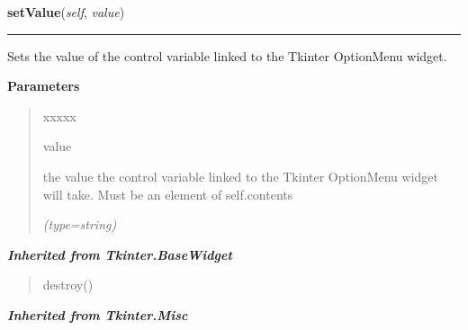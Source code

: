 \hspace{.8\funcindent}\begin{boxedminipage}{\funcwidth}

    \raggedright \textbf{setValue}(\textit{self}, \textit{value})

    \vspace{-1.5ex}

    \rule{\textwidth}{0.5\fboxrule}
\setlength{\parskip}{2ex}
    Sets the value of the control variable linked to the Tkinter OptionMenu
    widget.

\setlength{\parskip}{1ex}
      \textbf{Parameters}
      \vspace{-1ex}

      \begin{quote}
        \begin{Ventry}{xxxxx}

          \item[value]

          the value the control variable linked to the Tkinter OptionMenu 
          widget will take. Must be an element of 
          {\textbar}self.contents{\textbar}

            {\it (type=string)}

        \end{Ventry}

      \end{quote}

    \end{boxedminipage}


\large{\textbf{\textit{Inherited from Tkinter.BaseWidget}}}

\begin{quote}
destroy()
\end{quote}

\large{\textbf{\textit{Inherited from Tkinter.Misc}}}

